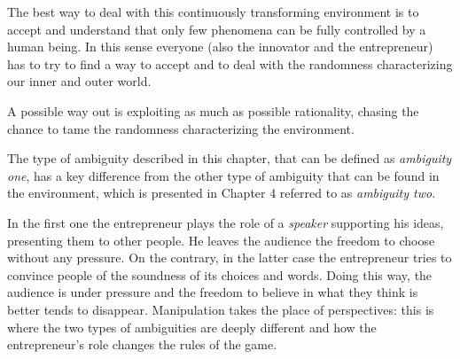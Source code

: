 The best way to deal with this continuously transforming environment is to accept and understand that only few phenomena can be fully controlled by a human being. In this sense everyone (also the innovator and the entrepreneur) has to try to find a way to accept and to deal with the randomness characterizing our inner and outer world.

A possible way out is exploiting as much as possible rationality, chasing the chance to tame the randomness characterizing the environment.

The type of ambiguity described in this chapter, that can be defined as \textit{ambiguity one}, has a key difference from the other type of ambiguity that can be found in the environment, which is presented in Chapter 4 referred to as \textit{ambiguity two}.

In the first one the entrepreneur plays the role of a \textit{speaker} supporting his ideas, presenting them to other people. He leaves the audience the freedom to choose without any pressure. On the contrary, in the latter case the entrepreneur tries to convince people of the soundness of its choices and words. Doing this way, the audience is under pressure and the freedom to believe in what they think is better tends to disappear. Manipulation takes the place of perspectives: this is where the two types of ambiguities are deeply different and how the entrepreneur’s role changes the rules of the game.

